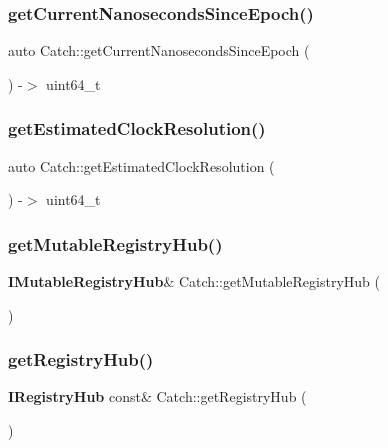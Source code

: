 \subsubsection{getCurrentNanosecondsSinceEpoch()}
{\footnotesize\ttfamily auto Catch\+::get\+Current\+Nanoseconds\+Since\+Epoch (\begin{DoxyParamCaption}{ }\end{DoxyParamCaption}) -\/$>$  uint64\+\_\+t}

\mbox{\label{namespace_catch_ac8e1ed37624bd0d97b2c0d4ec099d31f}} 
\subsubsection{getEstimatedClockResolution()}
{\footnotesize\ttfamily auto Catch\+::get\+Estimated\+Clock\+Resolution (\begin{DoxyParamCaption}{ }\end{DoxyParamCaption}) -\/$>$  uint64\+\_\+t}

\mbox{\label{namespace_catch_ac9ddcc6d66079add9cb2a3140b8ae51e}} 
\subsubsection{getMutableRegistryHub()}
{\footnotesize\ttfamily \textbf{ I\+Mutable\+Registry\+Hub}\& Catch\+::get\+Mutable\+Registry\+Hub (\begin{DoxyParamCaption}{ }\end{DoxyParamCaption})}

\mbox{\label{namespace_catch_a6332c92ab0c3952586b22cb96fdb8d44}} 
\subsubsection{getRegistryHub()}
{\footnotesize\ttfamily \textbf{ I\+Registry\+Hub} const\& Catch\+::get\+Registry\+Hub (\begin{DoxyParamCaption}{ }\end{DoxyParamCaption})}

\mbox{\label{namespace_catch_aff60c1de6ac6cea30175d70e33d83c8e}} 
